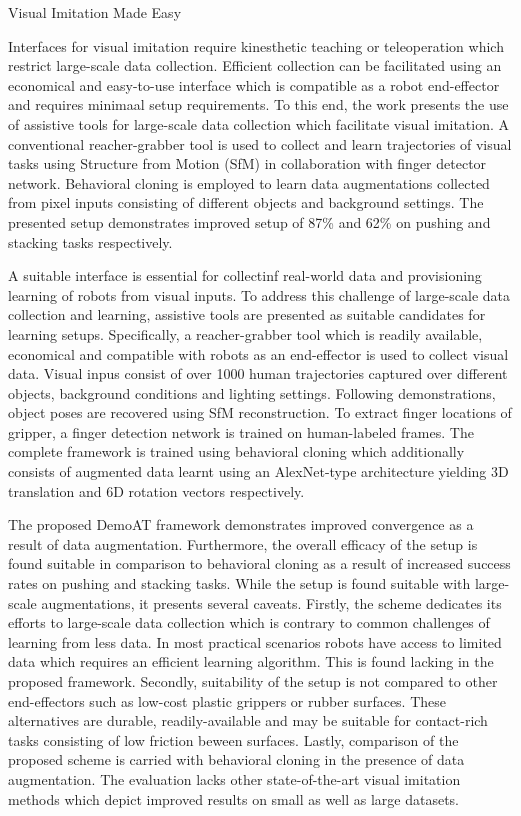 \documentclass[11pt,letterpaper]{article}
\begin{document}
\begin{center}
  \large{Visual Imitation Made Easy}
\end{center}

Interfaces for visual imitation require kinesthetic teaching or teleoperation which restrict large-scale data collection. Efficient collection can be facilitated using an economical and easy-to-use interface which is compatible as a robot end-effector and requires minimaal setup requirements. To this end, the work presents the use of assistive tools for large-scale data collection which facilitate visual imitation. A conventional reacher-grabber tool is used to collect and learn trajectories of visual tasks using Structure from Motion (SfM) in collaboration with finger detector network. Behavioral cloning is employed to learn data augmentations collected from pixel inputs consisting of different objects and background settings. The presented setup demonstrates improved setup of 87\% and 62\% on pushing and stacking tasks respectively.

A suitable interface is essential for collectinf real-world data and provisioning learning of robots from visual inputs. To address this challenge of large-scale data collection and learning, assistive tools are presented as suitable candidates for learning setups. Specifically, a reacher-grabber tool which is readily available, economical and compatible with robots as an end-effector is used to collect visual data. Visual inpus consist of over 1000 human trajectories captured over different objects, background conditions and lighting settings. Following demonstrations, object poses are recovered using SfM reconstruction. To extract finger locations of gripper, a finger detection network is trained on human-labeled frames. The complete framework is trained using behavioral cloning which additionally consists of augmented data learnt using an AlexNet-type architecture yielding 3D translation and 6D rotation vectors respectively. 

The proposed DemoAT framework demonstrates improved convergence as a result of data augmentation. Furthermore, the overall efficacy of the setup is found suitable in comparison to behavioral cloning as a result of increased success rates on pushing and stacking tasks. While the setup is found suitable with large-scale augmentations, it presents several caveats. Firstly, the scheme dedicates its efforts to large-scale data collection which is contrary to common challenges of learning from less data. In most practical scenarios robots have access to limited data which requires an efficient learning algorithm. This is found lacking in the proposed framework. Secondly, suitability of the setup is not compared to other end-effectors such as low-cost plastic grippers or rubber surfaces. These alternatives are durable, readily-available and may be suitable for contact-rich tasks consisting of low friction beween surfaces. Lastly, comparison of the proposed scheme is carried with behavioral cloning in the presence of data augmentation. The evaluation lacks other state-of-the-art visual imitation methods which depict improved results on small as well as large datasets.
\end{document}
